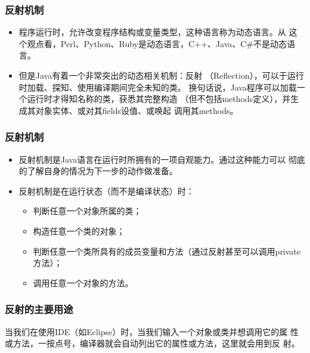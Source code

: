 \begin{frame}[fragile] %
  \frametitle{反射机制}

  \begin{itemize}
  \item 程序运行时，允许改变程序结构或变量类型，这种语言称为动态语言。从
    这个观点看，Perl、Python、Ruby是动态语言，C++、Java、C\#不是动态语
    言。
  \item 但是Java有着一个非常突出的动态相关机制：{\Red 反射
      （Reflection）}，可以于运行时加载、探知、使用编译期间完全未知的类。
    换句话说，Java程序可以加载一个运行时才得知名称的类，获悉其完整构造
    （但不包括methods定义），并生成其对象实体、或对其fields设值、或唤起
    调用其methods。
  \end{itemize}
\end{frame}

\begin{frame}[fragile] %
  \frametitle{反射机制}

  \begin{itemize}
  \item 反射机制是Java语言在运行时所拥有的一项自观能力。通过这种能力可以
    彻底的了解自身的情况为下一步的动作做准备。
  \item 反射机制是在运行状态（而不是编译状态）时：

    \begin{itemize}\kai
    \item 判断任意一个对象所属的类；
    \item 构造任意一个类的对象；
    \item 判断任意一个类所具有的成员变量和方法（通过反射甚至可以调用private方法）；
    \item 调用任意一个对象的方法。
    \end{itemize}

  \end{itemize}
\end{frame}


\begin{frame}[fragile] %
  \frametitle{反射的主要用途}


  当我们在使用IDE（如Eclipse）时，当我们输入一个对象或类并想调用它的属
  性或方法，一按点号，编译器就会自动列出它的属性或方法，这里就会用到反
  射。

\end{frame}

